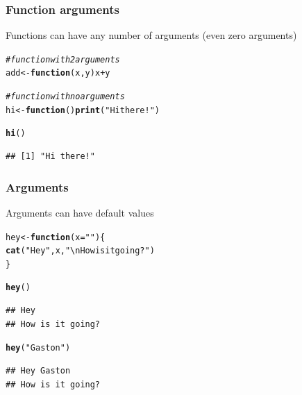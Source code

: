\documentclass[12pt]{beamer}\usepackage[]{graphicx}\usepackage[]{color}
\makeatletter
\newcommand{\hlstr}[1]{\textcolor[rgb]{0.192,0.494,0.8}{#1}}%
\newcommand{\hlcom}[1]{\textcolor[rgb]{0.678,0.584,0.686}{\textit{#1}}}%
\newcommand{\hlopt}[1]{\textcolor[rgb]{0,0,0}{#1}}%
\newcommand{\hlstd}[1]{\textcolor[rgb]{0.345,0.345,0.345}{#1}}%
\newcommand{\hlkwa}[1]{\textcolor[rgb]{0.161,0.373,0.58}{\textbf{#1}}}%
\newcommand{\hlkwb}[1]{\textcolor[rgb]{0.69,0.353,0.396}{#1}}%
\newcommand{\hlkwc}[1]{\textcolor[rgb]{0.333,0.667,0.333}{#1}}%
\newcommand{\hlkwd}[1]{\textcolor[rgb]{0.737,0.353,0.396}{\textbf{#1}}}%
\newenvironment{kframe}{%
 \def\at@end@of@kframe{}%
 \ifinner\ifhmode%
  \def\at@end@of@kframe{\end{minipage}}%
  \begin{minipage}{\columnwidth}%
 \fi\fi%
 \def\FrameCommand##1{\hskip\@totalleftmargin \hskip-\fboxsep
 \colorbox{shadecolor}{##1}\hskip-\fboxsep
     \hskip-\linewidth \hskip-\@totalleftmargin \hskip\columnwidth}%
 \MakeFramed {\advance\hsize-\width
   \@totalleftmargin\z@ \linewidth\hsize
   \@setminipage}}%
 {\par\unskip\endMakeFramed%
 \at@end@of@kframe}
\newenvironment{knitrout}{}{} %
\makeatother
\begin{document}

\begin{frame}[fragile]
\frametitle{Function arguments}

Functions can have any number of arguments (even zero arguments)
\begin{knitrout}\footnotesize
{}\color{fgcolor}\begin{kframe}
\begin{alltt}
\hlcom{# function with 2 arguments}
\hlstd{add} \hlkwb{<-} \hlkwa{function}\hlstd{(}\hlkwc{x}\hlstd{,} \hlkwc{y}\hlstd{) x} \hlopt{+} \hlstd{y}

\hlcom{# function with no arguments}
\hlstd{hi} \hlkwb{<-} \hlkwa{function}\hlstd{()} \hlkwd{print}\hlstd{(}\hlstr{"Hi there!"}\hlstd{)}

\hlkwd{hi}\hlstd{()}
\end{alltt}
\begin{verbatim}
## [1] "Hi there!"
\end{verbatim}
\end{kframe}
\end{knitrout}

\end{frame}


\begin{frame}[fragile]
\frametitle{Arguments}

Arguments can have default values
\begin{knitrout}\footnotesize
{}\color{fgcolor}\begin{kframe}
\begin{alltt}
\hlstd{hey} \hlkwb{<-} \hlkwa{function}\hlstd{(}\hlkwc{x} \hlstd{=} \hlstr{""}\hlstd{) \{}
  \hlkwd{cat}\hlstd{(}\hlstr{"Hey"}\hlstd{, x,} \hlstr{"\textbackslash{}nHow is it going?"}\hlstd{)}
\hlstd{\}}

\hlkwd{hey}\hlstd{()}
\end{alltt}
\begin{verbatim}
## Hey  
## How is it going?
\end{verbatim}
\begin{alltt}
\hlkwd{hey}\hlstd{(}\hlstr{"Gaston"}\hlstd{)}
\end{alltt}
\begin{verbatim}
## Hey Gaston 
## How is it going?
\end{verbatim}
\end{kframe}
\end{knitrout}

\end{frame}
\end{document}
